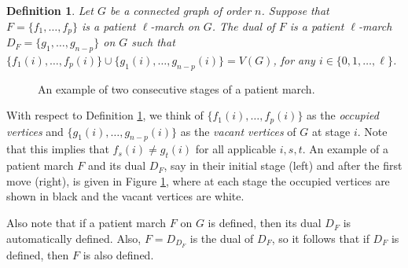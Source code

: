 \documentclass{article}
\newtheorem{definition}[theorem]{Definition}
\begin{document}
\begin{definition}\label{def:dual-march}
 Let $G$ be a connected graph of order $n$. Suppose that $F=\{f_1,\ldots,f_p\}$ is a patient $\ell$-march on $G$. The \emph{dual of $F$} is a patient $\ell$-march $D_F=\{g_1,\ldots,g_{n-p}\}$ on $G$ such that
 $\{f_1(i),\ldots,f_p(i)\}\cup \{g_1(i),\ldots,g_{n-p}(i)\}=V(G)$, for any $i\in\{0,1,\ldots,\ell\}$. 
\end{definition}

\begin{figure}[htbp]
    \centering
\hspace{50 pt}
    \caption{An example of two consecutive stages of a patient march.}
    \label{fig:figure_1}
\end{figure}

With respect to Definition \ref{def:dual-march}, we think of $\{f_1(i),\ldots,f_p(i)\}$ as the \emph{occupied vertices} and $\{g_1(i),\ldots,g_{n-p}(i)\}$ as the \emph{vacant vertices} of $G$ at stage $i$. Note that this implies that $f_s(i)\not=g_t(i)$ for all applicable $i,s,t$. An example of a patient march $F$ and its dual $D_F$, say in their initial stage (left) and after the first move (right), is given in Figure \ref{fig:figure_1}, where at each stage the occupied vertices are shown in black and the vacant vertices are white.  

Also note that if a patient march $F$  on $G$ is defined, then its dual $D_F$ is automatically defined. Also, $F=D_{D_F}$ is the dual of $D_F$, so it follows that if $D_F$ is defined, then $F$ is also defined. 
\end{document}
